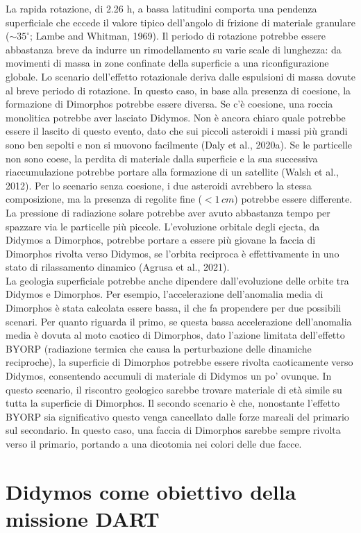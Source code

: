 \documentclass[a4paper,11pt,openright]{book}
\begin{document}
La rapida rotazione, di 2.26 h, a bassa latitudini comporta una pendenza superficiale che eccede il valore tipico dell'angolo di frizione di materiale granulare ($\sim 35^{\circ}$; Lambe and Whitman, 1969). Il periodo di rotazione potrebbe essere abbastanza breve da indurre un rimodellamento su varie scale di lunghezza: da movimenti di massa in zone confinate della superficie a una riconfigurazione globale. Lo scenario dell'effetto rotazionale deriva dalle espulsioni di massa dovute al breve periodo di rotazione. In questo caso, in base alla presenza di coesione, la formazione di Dimorphos potrebbe essere diversa. Se c'è coesione, una roccia monolitica potrebbe aver lasciato Didymos. Non è ancora chiaro quale potrebbe essere il lascito di questo evento, dato che sui piccoli asteroidi i massi più grandi sono ben sepolti e non si muovono facilmente (Daly et al., 2020a). Se le particelle non sono coese, la perdita di materiale dalla superficie e la sua successiva riaccumulazione potrebbe portare alla formazione di un satellite (Walsh et al., 2012). Per lo scenario senza coesione, i due asteroidi avrebbero la stessa composizione, ma la presenza di regolite fine ($<1\,cm$) potrebbe essere differente. La pressione di radiazione solare potrebbe aver avuto abbastanza tempo per spazzare via le particelle più piccole. L'evoluzione orbitale degli ejecta, da Didymos a Dimorphos, potrebbe portare a essere più giovane la faccia di Dimorphos rivolta verso Didymos, se l'orbita reciproca è effettivamente in uno stato di rilassamento dinamico (Agrusa et al., 2021).\\
La geologia superficiale potrebbe anche dipendere dall'evoluzione delle orbite tra Didymos e Dimorphos. Per esempio, l'accelerazione dell'anomalia media di Dimorphos è stata calcolata essere bassa, il che fa propendere per due possibili scenari. Per quanto riguarda il primo, se questa bassa accelerazione dell'anomalia media è dovuta al moto caotico di Dimorphos, dato l'azione limitata dell'effetto BYORP (radiazione termica che causa la perturbazione delle dinamiche reciproche), la superficie di Dimorphos potrebbe essere rivolta caoticamente verso Didymos, consentendo accumuli di materiale di Didymos un po' ovunque. In questo scenario, il riscontro geologico sarebbe trovare materiale di età simile su tutta la superficie di Dimorphos. Il secondo scenario è che, nonostante l'effetto BYORP sia significativo questo venga cancellato dalle forze mareali del primario sul secondario. In questo caso, una faccia di Dimorphos sarebbe sempre rivolta verso il primario, portando a una dicotomia nei colori delle due facce. 

\section{Didymos come obiettivo della missione DART}
\end{document}
